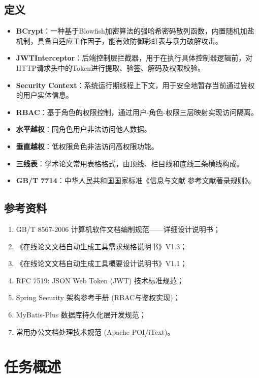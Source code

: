 \documentclass{../template/softeng}
\begin{document}
	\subsection{定义}
	\begin{itemize}
		\item \textbf{BCrypt}：一种基于Blowfish加密算法的强哈希密码散列函数，内置随机加盐机制，具备自适应工作因子，能有效防御彩虹表与暴力破解攻击。
		\item \textbf{JWTInterceptor}：后端控制层拦截器，用于在执行具体控制器逻辑前，对HTTP请求头中的Token进行提取、验签、解码及权限校验。
		\item \textbf{Security Context}：系统运行期线程上下文，用于安全地暂存当前通过鉴权的用户实体信息。
		\item \textbf{RBAC}：基于角色的权限控制，通过用户-角色-权限三层映射实现访问隔离。
		\item \textbf{水平越权}：同角色用户非法访问他人数据。
		\item \textbf{垂直越权}：低权限角色非法访问高权限功能。
		\item \textbf{三线表}：学术论文常用表格格式，由顶线、栏目线和底线三条横线构成。
		\item \textbf{GB/T 7714}：中华人民共和国国家标准《信息与文献 参考文献著录规则》。
	\end{itemize}

	\subsection{参考资料}
	\begin{enumerate}
		\item GB/T 8567-2006 计算机软件文档编制规范——详细设计说明书；
		\item 《在线论文文档自动生成工具需求规格说明书》V1.3；
		\item 《在线论文文档自动生成工具概要设计说明书》V1.1；
		\item RFC 7519: JSON Web Token (JWT) 技术标准规范；
        \item Spring Security 架构参考手册 (RBAC与鉴权实现)；
        \item MyBatis-Plus 数据库持久化层开发规范；
        \item 常用办公文档处理技术规范 (Apache POI/iText)。
    \end{enumerate}


	\section{任务概述}
\end{document}
